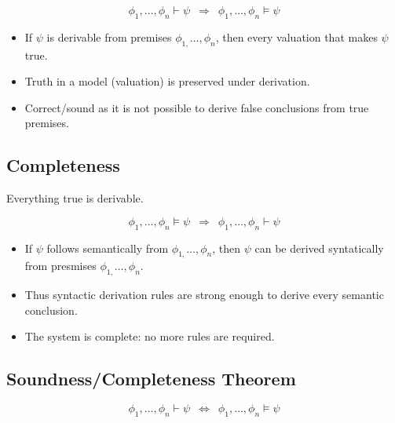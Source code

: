 \documentclass{article}
\begin{document}
\[
\phi_{1},\ldots,\phi_{n}\vdash\psi\,\,\,\Longrightarrow\,\,\,\phi_{1},\ldots,\phi_{n}\vDash\psi
\]
\begin{itemize}
    \item If $\psi$ is derivable from premises $\phi_{1,}\ldots,\phi_{n}$, then every valuation that makes $\psi$ true.
    \item Truth in a model (valuation) is preserved under derivation.
    \item Correct/sound as it is not possible to derive false conclusions from true premises.
\end{itemize}

\subsection{Completeness}

Everything true is derivable.

\[
\phi_{1},\ldots,\phi_{n}\vDash\psi\,\,\,\Longrightarrow\,\,\,\phi_{1},\ldots,\phi_{n}\vdash\psi
\]
\begin{itemize}
    \item If $\psi$ follows semantically from $\phi_{1,}\ldots,\phi_{n}$, then $\psi$ can be derived syntatically from presmises $\phi_{1,}\ldots,\phi_{n}$.
    \item Thus syntactic derivation rules are strong enough to derive every semantic conclusion.
    \item The system is complete: no more rules are required.
\end{itemize}

\subsection{Soundness/Completeness Theorem}

\[
\phi_{1},\ldots,\phi_{n}\vdash\psi\,\,\,\Longleftrightarrow\,\,\,\phi_{1},\ldots,\phi_{n}\vDash\psi
\]
\end{document}
